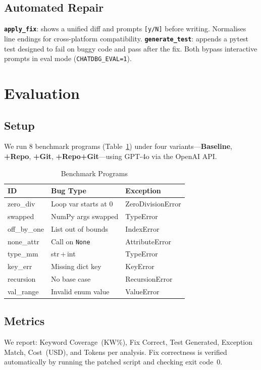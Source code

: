 \documentclass[conference]{IEEEtran}
\begin{document}
\subsection{Automated Repair}
\textbf{\texttt{apply\_fix}}: shows a unified diff and prompts \texttt{[y/N]}
before writing. Normalises line endings for cross-platform compatibility.
\textbf{\texttt{generate\_test}}: appends a pytest test designed to fail on
buggy code and pass after the fix.
Both bypass interactive prompts in eval mode (\texttt{CHATDBG\_EVAL=1}).

\section{Evaluation}

\subsection{Setup}
We run 8 benchmark programs (Table~\ref{tab:benchmarks}) under four
variants---\textbf{Baseline}, \textbf{+Repo}, \textbf{+Git},
\textbf{+Repo+Git}---using GPT-4o via the OpenAI API.

\begin{table}[t]
\centering
\caption{Benchmark Programs}
\label{tab:benchmarks}
\small
\setlength{\tabcolsep}{4pt}
\begin{tabular}{lll}
\toprule
\textbf{ID} & \textbf{Bug Type} & \textbf{Exception} \\
\midrule
zero\_div    & Loop var starts at 0      & ZeroDivisionError \\
swapped      & NumPy args swapped        & TypeError         \\
off\_by\_one & List out of bounds        & IndexError        \\
none\_attr   & Call on \texttt{None}     & AttributeError    \\
type\_mm     & str\,+\,int               & TypeError         \\
key\_err     & Missing dict key          & KeyError          \\
recursion    & No base case              & RecursionError    \\
val\_range   & Invalid enum value        & ValueError        \\
\bottomrule
\end{tabular}
\end{table}

\subsection{Metrics}
We report: Keyword Coverage~(KW\%), Fix Correct, Test Generated,
Exception Match, Cost~(USD), and Tokens per analysis. Fix correctness is
verified automatically by running the patched script and checking exit
code~0.
\end{document}
